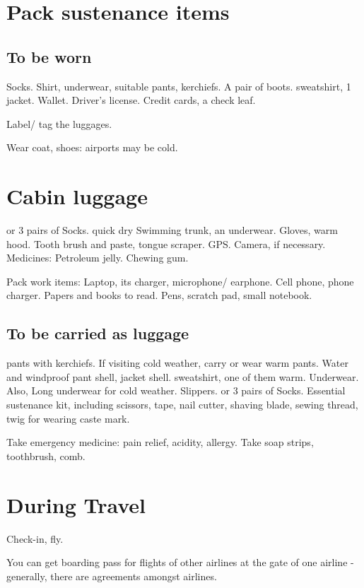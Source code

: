 \documentclass[oneside, article]{memoir}
\begin{document}
\section{Pack sustenance items}
\subsection{To be worn}
\subsubitem Socks. Shirt, underwear, suitable pants, kerchiefs.
\subsubitem A pair of boots.
 sweatshirt, 1 jacket.
\subsubitem Wallet. Driver's license. Credit cards, a check leaf.

Label/ tag the luggages.

Wear coat, shoes: airports may be cold.


\section{Cabin luggage}
 or 3 pairs of Socks.
\subsubitem quick dry Swimming trunk, an underwear.
\subsubitem Gloves, warm hood.
\subsubitem Tooth brush and paste, tongue scraper.
\subsubitem GPS. Camera, if necessary.
\subsubitem Medicines: Petroleum jelly.
\subsubitem Chewing gum.

Pack work items:
\subitem Laptop, its charger, microphone/ earphone.
\subitem Cell phone, phone charger.
\subitem Papers and books to read.
\subitem Pens, scratch pad, small notebook.

\subsection{To be carried as luggage}
 pants with kerchiefs. If visiting cold weather, carry or wear warm pants.
\subsubitem Water and windproof pant shell, jacket shell.
 sweatshirt, one of them warm.
\subsubitem Underwear. Also, Long underwear for cold weather.
\subsubitem Slippers.
 or 3 pairs of Socks.
\subsubitem Essential sustenance kit, including scissors, tape, nail cutter, shaving blade, sewing thread, twig for wearing caste mark.

\subitem Take emergency medicine: pain relief, acidity, allergy.
\subitem Take soap strips, toothbrush, comb.

\section{During Travel}
Check-in, fly.

You can get boarding pass for flights of other airlines at the gate of one airline - generally, there are agreements amongst airlines.
\end{document}
